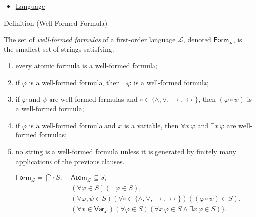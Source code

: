 \begin{dependencies}
\begin{itemize}
  \item \hyperref[def:language]{Language}
\end{itemize}
\end{dependencies}

\begin{definitionbox}{Definition (Well-Formed Formula)}
\begin{definition}
\label{def:wff-pred}
The set of \emph{well-formed formulas} of a first-order language
\(\mathcal L\), denoted \(\mathsf{Form}_{\mathcal L}\), is the smallest set of
strings satisfying:
\begin{enumerate}
\item every atomic formula is a well-formed formula;
\item if \(\varphi\) is a well-formed formula, then
      \(\neg\varphi\) is a well-formed formula;
\item if \(\varphi\) and \(\psi\) are well-formed formulas and
      \(\circ\in\{\land,\lor,\to,\leftrightarrow\}\), then
      \((\varphi\circ\psi)\) is a well-formed formula;
\item if \(\varphi\) is a well-formed formula and \(x\) is a variable, then
      \(\forall x\,\varphi\) and \(\exists x\,\varphi\) are well-formed
      formulas;
\item no string is a well-formed formula unless it is generated by finitely
      many applications of the previous clauses.
\end{enumerate}
\end{definition}
\end{definitionbox}

\begin{remark*}
\[
\begin{aligned}
\mathsf{Form}_{\mathcal L}
=
\bigcap\{S:\;&
\mathsf{Atom}_{\mathcal L}\subseteq S,\\
&(\forall\varphi\in S)(\neg\varphi\in S),\\
&(\forall\varphi,\psi\in S)
(\forall\circ\in\{\land,\lor,\to,\leftrightarrow\})
((\varphi\circ\psi)\in S),\\
&(\forall x\in\mathsf{Var}_{\mathcal L})(\forall\varphi\in S)
(\forall x\,\varphi\in S\land \exists x\,\varphi\in S)\}.
\end{aligned}
\]
\end{remark*}

